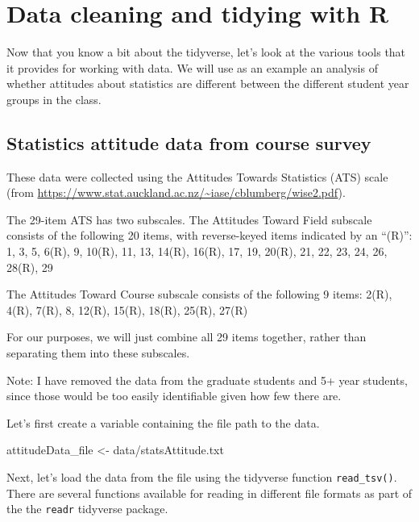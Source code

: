 \documentclass[
  12pt,
]{book}
\newenvironment{Shaded}{\begin{snugshade}}{\end{snugshade}}
\newcommand{\NormalTok}[1]{#1}
\newcommand{\OtherTok}[1]{\textcolor[rgb]{0.56,0.35,0.01}{#1}}
\newcommand{\StringTok}[1]{\textcolor[rgb]{0.31,0.60,0.02}{#1}}
\begin{document}
\hypertarget{data-cleaning-and-tidying-with-r}{%
\section{Data cleaning and tidying with R}\label{data-cleaning-and-tidying-with-r}}

Now that you know a bit about the tidyverse, let's look at the various tools that it provides for working with data. We will use as an example an analysis of whether attitudes about statistics are different between the different student year groups in the class.

\hypertarget{statistics-attitude-data-from-course-survey}{%
\subsection{Statistics attitude data from course survey}\label{statistics-attitude-data-from-course-survey}}

These data were collected using the Attitudes Towards Statistics (ATS) scale (from \url{https://www.stat.auckland.ac.nz/~iase/cblumberg/wise2.pdf}).

The 29-item ATS has two subscales. The Attitudes Toward Field subscale consists of the following 20 items, with reverse-keyed items indicated by an ``(R)'':
1, 3, 5, 6(R), 9, 10(R), 11, 13, 14(R), 16(R), 17, 19, 20(R), 21, 22, 23, 24, 26, 28(R), 29

The Attitudes Toward Course subscale consists of the following 9 items:
2(R), 4(R), 7(R), 8, 12(R), 15(R), 18(R), 25(R), 27(R)

For our purposes, we will just combine all 29 items together, rather than separating them into these subscales.

Note: I have removed the data from the graduate students and 5+ year students, since those would be too easily identifiable given how few there are.

Let's first create a variable containing the file path to the data.

\begin{Shaded}
\begin{Highlighting}[]
\NormalTok{attitudeData\_file }\OtherTok{\textless{}{-}} \StringTok{\textquotesingle{}data/statsAttitude.txt\textquotesingle{}}
\end{Highlighting}
\end{Shaded}

Next, let's load the data from the file using the tidyverse function \texttt{read\_tsv()}. There are several functions available for reading in different file formats as part of the the \texttt{readr} tidyverse package.
\end{document}
